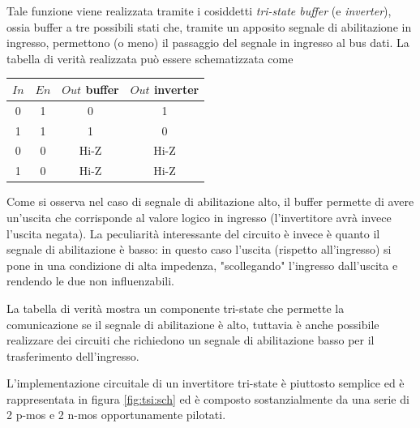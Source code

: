 	Tale funzione viene realizzata tramite i cosiddetti \textit{tri-state buffer} (e \textit{inverter}), ossia buffer a tre possibili stati che, tramite un apposito segnale di abilitazione in ingresso, permettono (o meno) il passaggio del segnale in ingresso al bus dati. La tabella di verità realizzata può essere schematizzata come
	\begin{center}
	\begin{tabular}{cc|c|c}
		$In$ & $En$ & $Out$ buffer & $Out$ inverter \\ \hline
		0 & 1 & 0 & 1 \\
		1 & 1 & 1 & 0 \\
		0 & 0 & Hi-Z & Hi-Z \\
		1 & 0 & Hi-Z & Hi-Z \\
	\end{tabular}			
	\end{center}

	Come si osserva nel caso di segnale di abilitazione alto, il buffer permette di avere un'uscita che corrisponde al valore logico in ingresso (l'invertitore avrà invece l'uscita negata). La peculiarità interessante del circuito è invece è quanto il segnale di abilitazione è basso: in questo caso l'uscita (rispetto all'ingresso) si pone in una condizione di alta impedenza, "scollegando" l'ingresso dall'uscita e rendendo le due non influenzabili.
	
	La tabella di verità mostra un componente tri-state che permette la comunicazione se il segnale di abilitazione è alto, tuttavia è anche possibile realizzare dei circuiti che richiedono un segnale di abilitazione basso per il trasferimento dell'ingresso.
	\vspace{5mm}
	
	L'implementazione circuitale di un invertitore tri-state è piuttosto semplice ed è rappresentata in figura \ref{fig:tsi:sch} ed è composto sostanzialmente da una serie di 2 p-mos e 2 n-mos opportunamente pilotati.
	
